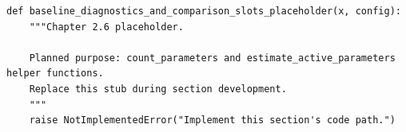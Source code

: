 \begin{lstlisting}[style=bookpython,caption={Planned code placeholder for baseline diagnostics and comparison slots.},label={lst:ch02-baseline-diagnostics-and-comparison-slots}]
def baseline_diagnostics_and_comparison_slots_placeholder(x, config):
    """Chapter 2.6 placeholder.

    Planned purpose: count_parameters and estimate_active_parameters helper functions.
    Replace this stub during section development.
    """
    raise NotImplementedError("Implement this section's code path.")
\end{lstlisting}
